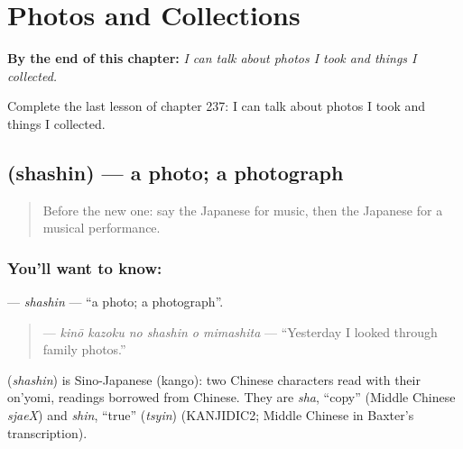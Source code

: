 
\chapter{Photos and Collections}
\label{ch:ja-photos-and-collections}

\begin{chapteropening}
\textbf{By the end of this chapter:} \emph{I can talk about photos I took and things I collected.}

Complete the last lesson of chapter 237: I can talk about photos I took and things I collected.
\end{chapteropening}

\section[\texorpdfstring{\ja{しゃしん} (shashin)}{しゃしん (shashin)}]{ (shashin) — a photo; a photograph}

\label{lesson:JA-C237-shashin}



\begin{quote}
Before the new one: say the Japanese for music, then the Japanese for a musical performance.
\end{quote}

\subsection*{You'll want to know: }
\textbf{} — \emph{shashin} — \textquotedblleft{}a photo; a photograph\textquotedblright{}.

\begin{quote}
\textbf{   } — \emph{kinō kazoku no shashin o mimashita} — \textquotedblleft{}Yesterday I looked through family photos.\textquotedblright{}
\end{quote}

\begin{cousinweb}
\textbf{} (\emph{shashin}) is Sino-Japanese (kango): two Chinese characters read with their on'yomi, readings borrowed from Chinese. They are \emph{sha}, \textquotedblleft{}copy\textquotedblright{} (Middle Chinese \emph{sjaeX}) and \emph{shin}, \textquotedblleft{}true\textquotedblright{} (\emph{tsyin}) (KANJIDIC2; Middle Chinese in Baxter's transcription).
\end{cousinweb}

